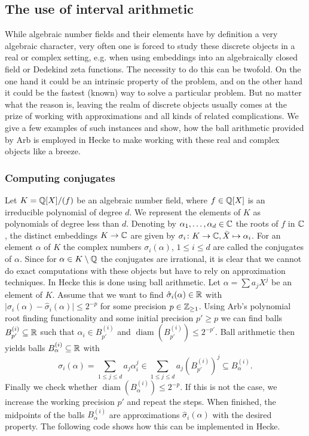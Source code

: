 \documentclass{sig-alternate-05-2015}
\begin{document}
\subsection{The use of interval arithmetic}

While algebraic number fields and their elements have by definition a very algebraic character, very often one is forced to study these discrete objects in a real or complex setting, e.g. when using embeddings into an algebraically closed field or Dedekind zeta functions.
The necessity to do this can be twofold. On the one hand it could be an intrinsic property of the problem, and on the other hand it could be the fastest (known) way to solve a particular problem.
But no matter what the reason is, leaving the realm of discrete objects usually comes at the prize of working with approximations and all kinds of related complications.
We give a few examples of such instances and show, how the ball arithmetic provided by Arb is employed in Hecke to make working with these real and complex objects like a breeze.

\subsubsection{Computing conjugates}\label{subsub:conj}

Let $K = \mathbb{Q}[X]/(f)$ be an algebraic number field, where $f \in \mathbb{Q}[X]$ is an irreducible polynomial of degree $d$.
We represent the elements of $K$ as polynomials of degree less than $d$.
Denoting by $\alpha_1,\dotsc,\alpha_d \in \mathbb{C}$ the roots of $f$ in $\mathbb{C}$, the distinct embeddings $K \to \mathbb{C}$ are given by $\sigma_i \colon K \to \mathbb{C}, \bar X \mapsto \alpha_i$. For an element $\alpha$ of $K$ the complex numbers $\sigma_i(\alpha)$, $1 \leq i \leq d$ are called the conjugates of $\alpha$.
Since for $\alpha \in K \setminus \mathbb{Q}$ the conjugates are irrational, it is clear that we cannot do exact computations with these objects but have to rely on approximation techniques.
In Hecke this is done using ball arithmetic. Let $\alpha = \sum a_j X^j$ be an element of $K$. 
Assume that we want to find $\hat \sigma_i(\alpha) \in \mathbb{R}$ with $\lvert \sigma_i(\alpha) - \hat \sigma_i(\alpha) \rvert \leq 2^{-p}$ for some precision $p \in \mathbb{Z}_{\geq 1}$.
Using Arb's polynomial root finding functionality and some initial precision $p' \geq p$ we can find balls $B_{p'}^{(i)} \subseteq \mathbb{R}$ such that $\alpha_i \in B_{p'}^{(i)}$ and $\operatorname{diam}(B_{p'}^{(i)}) \leq 2^{-p'}$.
Ball arithmetic then yields balls $B_\alpha^{(i)} \subseteq \mathbb{R}$ with
\[ \sigma_i(\alpha) = \sum_{1 \leq j \leq d} a_j \alpha_i^j \in \sum_{1 \leq j \leq d} a_j (B_{p'}^{(i)})^j\subseteq B_\alpha^{(i)}. \]
Finally we check whether $\operatorname{diam}(B_\alpha^{(i)}) \leq 2^{-p}$. If this is not the case, we increase the working precision $p'$ and repeat the steps.
When finished, the midpoints of the balls $B_\alpha^{(i)}$ are approximations $\hat \sigma_i(\alpha)$ with the desired property.
The following code shows how this can be implemented in Hecke.
\end{document}
